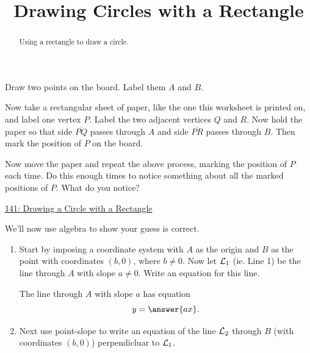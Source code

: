 \documentclass{ximera}
\title{Drawing Circles with a Rectangle}
\begin{document}
\begin{abstract}
Using  a rectangle to draw a circle.
\end{abstract}
\maketitle


\begin{question}  \label{Qpf3f3mbmZ}

Draw two points on the board. Label them $A$ and $B$.

Now take a rectangular sheet of paper, like the one this worksheet is printed on, and label one vertex $P$. Label the two adjacent vertices $Q$ and $R$. Now hold the paper so that side $\overline{PQ}$ passes through $A$ and side $\overline{PR}$ passes through $B$. Then mark the position of $P$ on the board.

Now move the paper and repeat the above process, marking the position of $P$ each time. Do this enough times to notice something about all the marked positions of $P$. What do you notice?
\begin{freeResponse}
\end{freeResponse}


\begin{onlineOnly}
    \begin{center}
\end{center}
\end{onlineOnly}

\href{https://www.desmos.com/calculator/8872fdmjxr}{141: Drawing a Circle with a Rectangle}



We'll now use algebra to show your guess is correct.

\begin{enumerate}
\item Start by imposing a coordinate system with $A$ as the origin and $B$ as the point with coordinates $(b,0)$, where $b\neq 0$. Now let ${\cal L}_1$ (ie. Line 1) be the line through $A$ with slope $a\neq 0$. Write an equation for this line.

The line through $A$ with slope $a$ has equation
\[
    y = \answer{ax}.
\]

\item Next use point-slope to write an equation of the line ${\cal L}_2$ through $B$ (with coordinates $(b,0)$)  perpendicluar to ${\cal L}_1$.


\end{enumerate}
\end{question}
\end{document}
